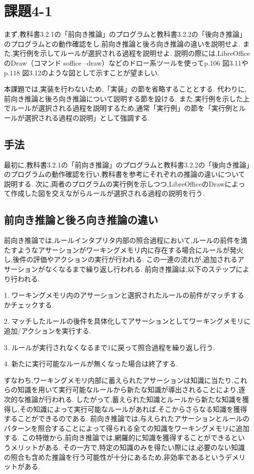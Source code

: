 \documentclass[uplatex,12pt]{jsarticle}
\begin{document}
\section{課題4-1}
\begin{screen}
    まず,教科書3.2.1の「前向き推論」のプログラムと教科書3.2.2の「後向き推論」のプログラムとの動作確認をし,前向き推論と後ろ向き推論の違いを説明せよ.
    また,実行例を示してルールが選択される過程を説明せよ.
    説明の際には,LibreOfficeのDraw（コマンド soffice --draw）などのドロー系ツールを使ってp.106 図3.11やp.118 図3.12のような図として示すことが望ましい.
\end{screen}
本課題では,実装を行わないため,「実装」の節を省略することとする.
代わりに,前向き推論と後ろ向き推論について説明する節を設ける.
また,実行例を示した上でルールが選択される過程を説明するため,通常「実行例」の節を「実行例とルールが選択される過程の説明」として強調する.

\subsection{手法}
最初に,教科書3.2.1の「前向き推論」のプログラムと教科書3.2.2の「後向き推論」のプログラムの動作確認を行い,教科書を参考にそれぞれの推論の違いについて説明する.
次に,両者のプログラムの実行例を示しつつ,LibreOfficeのDrawによって作成した図を交えながらルールが選択される過程の説明を行う.

\newpage

\subsection{前向き推論と後ろ向き推論の違い}
前向き推論では,ルールインタプリタ内部の照合過程において,ルールの前件を満たすようなアサーションがワーキングメモリ内に存在する場合にルールが発火し,後件の評価やアクションの実行が行われる.
この一連の流れが,追加されるアサーションがなくなるまで繰り返し行われる.
前向き推論は,以下のステップにより行われる.
\begin{description}
    \item 1. ワーキングメモリ内のアサーションと選択されたルールの前件がマッチするかチェックする.
    \item 2. マッチしたルールの後件を具体化してアサーションとしてワーキングメモリに追加/アクションを実行する.
    \item 3. ルールが実行されなくなるまで1に戻って照合過程を繰り返し行う.
    \item 4. 新たに実行可能なルールが無くなった場合は終了する.
\end{description}
すなわち,ワーキングメモリ内部に蓄えられたアサーションは知識に当たり,これらの知識を用いて実行可能なルールから新たな知識が導出されることにより,逐次的な推論が行われる.
したがって,蓄えられた知識とルールから新たな知識を獲得し,その知識によって実行可能なルールがあれば,そこからさらなる知識を獲得することができるのである.
前向き推論では,与えられたアサーションとルールのパターンを照合することによって得られる全ての知識をワーキングメモリに追加する.
この特徴から,前向き推論では,網羅的に知識を獲得することができるというメリットがある.
その一方で,特定の知識のみを得たい際には,必要のない知識の照合も含めた推論を行う可能性が十分にあるため,非効率であるというデメリットがある. \\
\end{document}
